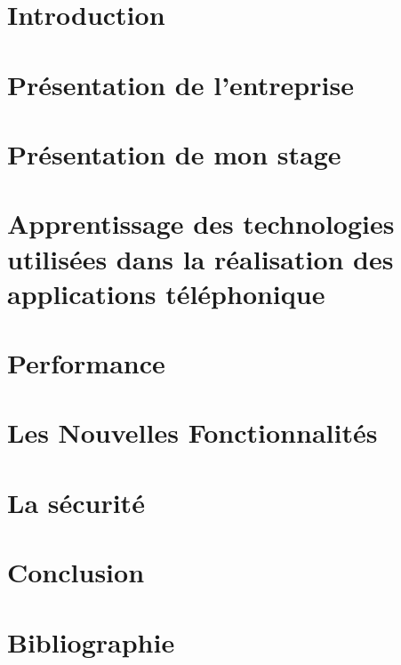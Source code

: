 \documentclass[asi]{picINSA}
\begin{document}
 \couverture{}
 \informationsGenerales{}


 
 \tableofcontents

 \listoffigures

 \chapter{Introduction}
 	
 	
 \chapter{Présentation de l'entreprise}
	

 \chapter{Présentation de mon stage}
	
 
 \chapter{Apprentissage des technologies utilisées dans la réalisation des applications téléphonique}
 	

 \chapter{Performance}
	

 \chapter{Les Nouvelles Fonctionnalités}
	

 \chapter{La sécurité}
	

 \chapter{Conclusion}
	

 \chapter{Bibliographie}
	

 \newpage
 
\end{document}
